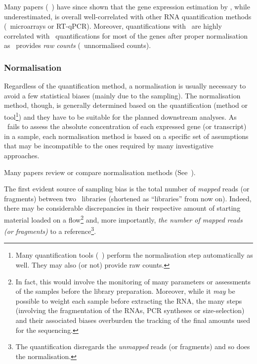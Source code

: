 Many papers
(\eg~\citet{Fonseca2014,errorsRNAquant,tophatStarwhatever})
have since shown that
the gene expression estimation by \htseq, while underestimated, is overall
well-correlated with other \gls{RNA} quantification methods
(\eg\ microarrays or \gls{RT-qPCR}).
Moreover, quantifications with \htseq\ are highly correlated with \cuffl\
quantifications for most of the genes after
proper normalisation~
as \htseq\ provides \emph{raw counts} (\ie\ unnormalised counts).\mybr\


\subsubsection{Normalisation}\label{subsub:norm}
Regardless of the quantification method, a normalisation is usually
necessary to avoid a few statistical biases (mainly due to the sampling). The
normalisation method, though, is generally determined based on the quantification
(method or tool\footnote{Many quantification tools (\eg\ \cuffl) perform
the normalisation step automatically as well. They may also (or not) provide
raw counts.}) and they have to be suitable for the planned downstream analyses.
As \Rnaseq\ fails to assess the absolute concentration of each
expressed gene (or transcript) in a sample, each normalisation method is based on
a specific set of assumptions that may be incompatible to the ones required by
many investigative approaches.\mybr\

Many papers review or compare normalisation methods (See~\citet{Dillies2013,%
normSigCancerHelp,NormImpact,ruvseqComQN}).\mybr\

The first evident source of sampling bias is the total number of \emph{mapped}
reads (or fragments) between two \Rnaseq\ libraries (shortened as
\enquote{libraries} from now on). Indeed, there may be considerable discrepancies in
their respective amount of starting material loaded on a
\gls{flow}\footnote{In fact, this would involve the monitoring of many parameters
or assessments of the samples before the library preparation. Moreover, while
it \emph{may} be possible to weight each sample before extracting the \gls{RNA},
the many steps (involving the fragmentation of the \glspl{RNA},
\gls{PCR} syntheses or size-selection) and their associated biases
overburden the tracking of the final amounts used for the sequencing.}
and, more importantly, \emph{the number of mapped reads (or
fragments)} to a reference\footnote{The quantification disregards the
\emph{unmapped} reads (or fragments) and so does the normalisation.}.\mybr\

